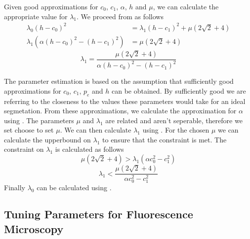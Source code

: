 \begin{definition} Given good approximations for $c_0$, $c_1$, $\alpha$, $h$ and $\mu$, we can calculate the appropriate value for $\lambda_1$. We proceed from  as follows
\begin{equation*}\begin{split}
	\lambda_0(h-c_0)^2 &= \lambda_1(h-c_1)^2 + \mu(2\sqrt{2}+4)\\
	\lambda_1 \left( \alpha(h-c_0)^2-(h-c_1)^2 \right) &= \mu(2\sqrt{2}+4)
\end{split}\end{equation*}
\begin{equation}
	\lambda_1 = \frac{\mu(2\sqrt{2}+4)}{\alpha(h-c_0)^2-(h-c_1)^2}
	\label{eq:lambda1approximation}
\end{equation}
\end{definition}

\begin{definition}
	The parameter estimation is based on the assumption that sufficiently good approximations for $c_0$, $c_1$, $p_e$ and $h$ can be obtained. By sufficiently good we are referring to the closeness to the values these parameters would take for an ideal segmetation. From these approximations, we calculate the approximation for $\alpha$ using . The parameters $\mu$ and $\lambda_1$ are related and aren't seperable, therefore we set choose to set $\mu$. We can then calculate $\lambda_1$ using . For the chosen $\mu$ we can calculate the upperbound on $\lambda_1$ to ensure that the constraint  is met. The constraint on $\lambda_1$ is calculated as follows
\begin{equation*}
\mu\left( 2\sqrt{2} + 4 \right) > \lambda_1(\alpha c_0^2 - c_1^2)
\end{equation*}
\begin{equation}
	\lambda_1 < \frac{\mu\left( 2\sqrt{2} + 4 \right)}{\alpha c_0^2 - c_1^2}
\end{equation}
Finally $\lambda_0$ can be calculated using .
\end{definition}

\subsection{Tuning Parameters for Fluorescence Microscopy}
\label{sec:cvgc_parameterestimation}

